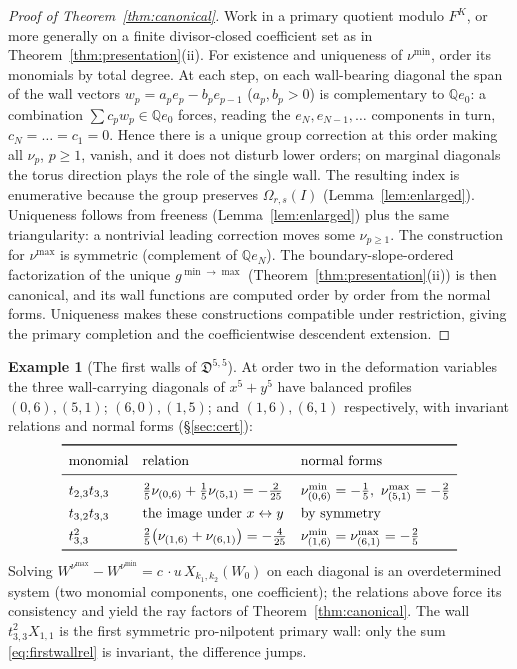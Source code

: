 \documentclass[11pt]{amsart}
\theoremstyle{definition}
\newtheorem{example}[theorem]{Example}
\theoremstyle{remark}
\newcommand{\QQ}{\mathbb{Q}}
\newcommand{\Dscr}{\mathfrak{D}}
\newcommand{\Om}{\Omega_{r,s}}
\begin{document}
\begin{proof}[Proof of Theorem~\ref{thm:canonical}]
Work in a primary quotient modulo $F^K$, or more generally on a finite
divisor-closed coefficient set as in Theorem~\ref{thm:presentation}(ii).
For existence and uniqueness of $\nu^{\min}$, order its monomials by total
degree. At each step, on each wall-bearing diagonal the span of the wall
vectors $w_{p}=a_{p}e_{p}-b_{p}e_{p-1}$ ($a_{p},b_{p}>0$) is complementary to
$\QQ e_{0}$: a combination $\sum c_{p}w_{p}\in\QQ e_{0}$ forces, reading the
$e_{N},e_{N-1},\dots$ components in turn, $c_{N}=\dots=c_{1}=0$. Hence there is a
unique group correction at this order making all $\nu_{p}$, $p\ge1$, vanish, and
it does not disturb lower orders; on marginal diagonals the torus direction plays
the role of the single wall. The resulting index is enumerative because the group
preserves $\Om(I)$ (Lemma~\ref{lem:enlarged}). Uniqueness follows from
freeness (Lemma~\ref{lem:enlarged}) plus the same triangularity: a nontrivial leading correction moves some
$\nu_{p\ge1}$. The construction for $\nu^{\max}$ is symmetric (complement of
$\QQ e_{N}$). The boundary-slope-ordered factorization of the unique
$g^{\min\to\max}$ (Theorem~\ref{thm:presentation}(ii)) is then canonical, and its
wall functions are computed order by order from the normal forms. Uniqueness
makes these constructions compatible under restriction, giving the primary
completion and the coefficientwise descendent extension.
\end{proof}

\begin{example}[The first walls of $\Dscr^{5,5}$]
\label{ex:walls}
At order two in the deformation variables the three wall-carrying diagonals of
$x^{5}+y^{5}$ have balanced profiles $(0,6),(5,1)$; $(6,0),(1,5)$; and
$(1,6),(6,1)$ respectively, with invariant relations and normal forms (\S\ref{sec:cert}):
{\small
\[
\renewcommand{\arraystretch}{1.35}
\begin{array}{lll}
\toprule
\text{monomial} & \text{relation} & \text{normal forms}\\
\midrule
t_{2,3}t_{3,3} &
\tfrac25\nu_{(0,6)}+\tfrac15\nu_{(5,1)}=-\tfrac2{25} &
\nu^{\min}_{(0,6)}=-\tfrac15,\ \nu^{\max}_{(5,1)}=-\tfrac25\\
t_{3,2}t_{3,3} & \text{the image under $x\leftrightarrow y$} & \text{by symmetry}\\
t_{3,3}^{2} &
\tfrac25\bigl(\nu_{(1,6)}+\nu_{(6,1)}\bigr)=-\tfrac4{25} &
\nu^{\min}_{(1,6)}=\nu^{\max}_{(6,1)}=-\tfrac25\\
\bottomrule
\end{array}
\]
}
Solving $W^{\nu^{\max}}-W^{\nu^{\min}}=c\,\cdot u\,X_{k_{1},k_{2}}(W_{0})$ on each
diagonal is an overdetermined system (two monomial components, one
coefficient); the relations above force its consistency and yield the ray factors of
Theorem~\ref{thm:canonical}. The wall $t_{3,3}^{2}X_{1,1}$ is the first symmetric
pro-nilpotent primary wall: only the sum \eqref{eq:firstwallrel} is invariant,
the difference jumps.
\end{example}
\end{document}
